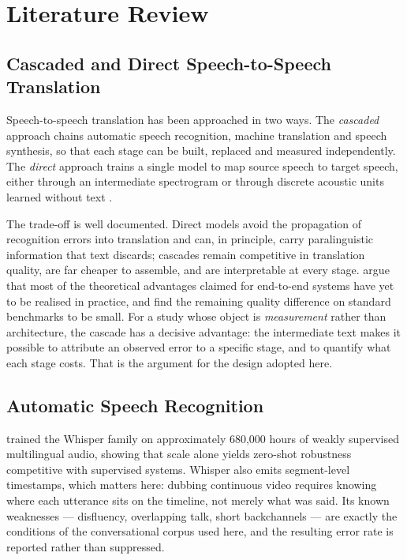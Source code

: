 \chapter{Literature Review}
\label{ch:literature}

\section{Cascaded and Direct Speech-to-Speech Translation}
\label{sec:lit_s2st}

Speech-to-speech translation has been approached in two ways. The \emph{cascaded} approach chains
automatic speech recognition, machine translation and speech synthesis, so that each stage can be
built, replaced and measured independently. The \emph{direct} approach trains a single model to map
source speech to target speech, either through an intermediate spectrogram
\cite{jia2022translatotron2} or through discrete acoustic units learned without text
\cite{lee2022discreteunits,inaguma2023unity}.

The trade-off is well documented. Direct models avoid the propagation of recognition errors into
translation and can, in principle, carry paralinguistic information that text discards; cascades
remain competitive in translation quality, are far cheaper to assemble, and are interpretable at
every stage.  argue that most of the theoretical advantages claimed for
end-to-end systems have yet to be realised in practice, and  find the
remaining quality difference on standard benchmarks to be small. For a study whose object is
\emph{measurement} rather than architecture, the cascade has a decisive advantage: the intermediate
text makes it possible to attribute an observed error to a specific stage, and to quantify what
each stage costs. That is the argument for the design adopted here.

\section{Automatic Speech Recognition}
\label{sec:lit_asr}

 trained the Whisper family on approximately 680{,}000 hours of weakly
supervised multilingual audio, showing that scale alone yields zero-shot robustness competitive
with supervised systems. Whisper also emits segment-level timestamps, which matters here: dubbing
continuous video requires knowing where each utterance sits on the timeline, not merely what was
said. Its known weaknesses --- disfluency, overlapping talk, short backchannels --- are exactly the
conditions of the conversational corpus used here, and the resulting error rate is reported rather
than suppressed.

